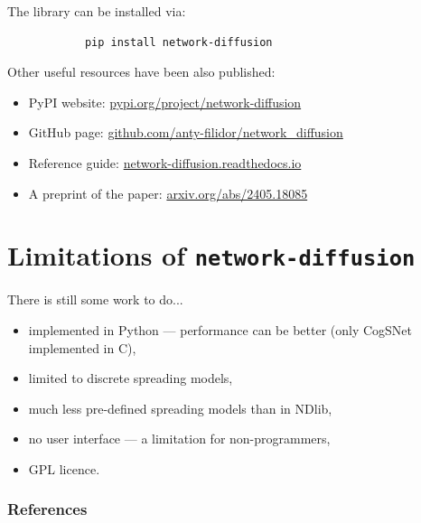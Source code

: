 \documentclass{beamer}
\begin{document}
\begin{frame}[fragile]{\secname}
    The library can be installed via:
    \begin{center}
        \large
        \begin{verbatim}
            pip install network-diffusion
        \end{verbatim}
    \end{center}
    Other useful resources have been also published:
    \begin{itemize}
        \item PyPI website: \url{pypi.org/project/network-diffusion}
        \item GitHub page: \url{github.com/anty-filidor/network_diffusion}
        \item Reference guide: \url{network-diffusion.readthedocs.io}
        \item A preprint of the paper: \url{arxiv.org/abs/2405.18085}
    \end{itemize}
\end{frame}

\section{Limitations of \lstinline[style=py]{network-diffusion}}

\begin{frame}{\secname}
    There is still some work to do...
    \begin{itemize}
        \item implemented in Python ---  performance can be better (only CogSNet implemented in C),
        \item limited to discrete spreading models,
        \item much less pre-defined spreading models than in NDlib,
        \item no user interface --- a limitation for non-programmers,
        \item GPL licence.
    \end{itemize}
\end{frame}

\begin{frame}[allowframebreaks]
    \frametitle{References}
    
    
\end{frame}

\addtocounter{framenumber}{1}
\end{document}
